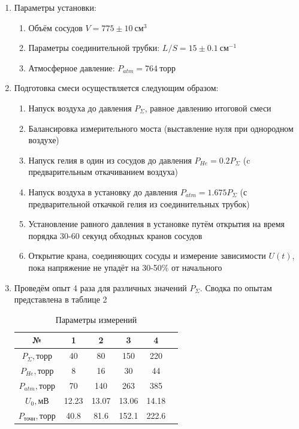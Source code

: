 \documentclass[a4paper,12pt]{article}
\begin{document}
\begin{enumerate}
\item Параметры установки:
    \begin{enumerate}
        \item Объём сосудов $V = 775 \pm 10 \ \text{см}^3$
        \item Параметры соединительной трубки: $L/S = 15 \pm 0.1 \ \text{см}^{-1}$
        \item Атмосферное давление: $P_{atm} = 764 \ \text{торр}$
    \end{enumerate}
\item Подготовка смеси осуществляется следующим образом:
    \begin{enumerate}
        \item Напуск воздуха до давления $P_\Sigma$, равное давлению итоговой смеси
        \item Балансировка измерительного моста (выставление нуля при однородном воздухе)
        \item Напуск гелия в один из сосудов до давления $P_{He} = 0.2 P_\Sigma$ (c предварительным откачиванием воздуха)
        \item Напуск воздуха в установку до давления $P_{atm} = 1.675 P_\Sigma $ (с предварительной откачкой гелия из соединительных трубок)
        \item Установление равного давления в установке путём открытия на время порядка 30-60 секунд обходных кранов сосудов
        \item Открытие крана, соединяющих сосуды и измерение зависимости $U(t)$, пока напряжение не упадёт на 30-50\% от начального

    \end{enumerate}
\item Проведём опыт 4 раза для различных значений $P_\Sigma$. Сводка по опытам представлена в таблице 2

\begin{center}
 \begin{table}[h!]
    \centering
    \caption{Параметры измерений}
    \begin{tabular}{|c|c|c|c|c|c|}
    \hline
    № & 1 & 2 & 3 & 4 \\ \hline
    $P_\Sigma, \text{торр}$ & 40 & 80 & 150 & 220 \\ \hline
    $P_{He}, \text{торр}$   & 8  & 16 & 30  & 44  \\ \hline
    $P_{atm},\text{торр}$   & 70 & 140& 263 & 385 \\ \hline
    $U_0, \text{мВ}     $   & 12.23 & 13.07 & 13.06 & 14.18 \\ \hline
    $P_{\text{точн}}, \text{торр}$ & 40.8 & 81.6 & 152.1 & 222.6  \\ \hline
    \end{tabular}
    \end{table}
\end{center}


\end{enumerate}
\end{document}
